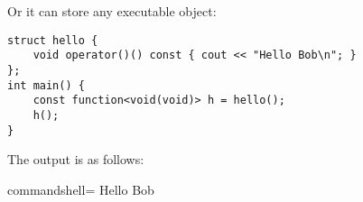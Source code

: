 Or it can store any executable object:

\begin{lstlisting}[style=styleCXX]
struct hello {
	void operator()() const { cout << "Hello Bob\n"; }
};
int main() {
	const function<void(void)> h = hello();
	h();
}
\end{lstlisting}

The output is as follows:

\begin{tcblisting}{commandshell={}}
Hello Bob
\end{tcblisting}












